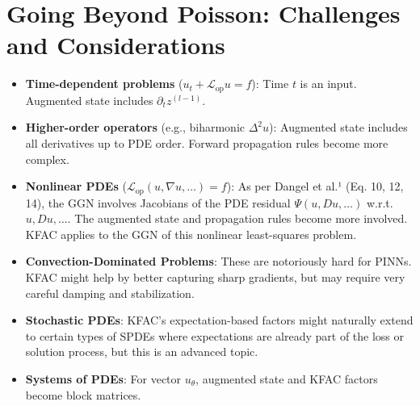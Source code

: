 \documentclass[12pt,a4paper]{article}
\newcommand{\Lop}{\mathcal{L}_{\text{op}}} %
\begin{document}
\section{Going Beyond Poisson: Challenges and Considerations}
\begin{itemize}[nosep,leftmargin=*]
\item \textbf{Time-dependent problems} (\(u_t + \Lop u = f\)): Time \(t\) is an input. Augmented state includes \(\partial_t z^{(l-1)}\).
\item \textbf{Higher-order operators} (e.g., biharmonic \(\Delta^2 u\)): Augmented state includes all derivatives up to PDE order. Forward propagation rules become more complex.
\item \textbf{Nonlinear PDEs} (\(\Lop(u, \nabla u, \dots) = f\)): As per Dangel et al.¹ (Eq. 10, 12, 14), the GGN involves Jacobians of the PDE residual \(\Psi(u, Du, \dots)\) w.r.t. \(u, Du, \dots\). The augmented state and propagation rules become more involved. KFAC applies to the GGN of this nonlinear least-squares problem.
\item \textbf{Convection-Dominated Problems}: These are notoriously hard for PINNs. KFAC might help by better capturing sharp gradients, but may require very careful damping and stabilization.
\item \textbf{Stochastic PDEs}: KFAC's expectation-based factors might naturally extend to certain types of SPDEs where expectations are already part of the loss or solution process, but this is an advanced topic.
\item \textbf{Systems of PDEs}: For vector \(u_\theta\), augmented state and KFAC factors become block matrices.
\end{itemize}
\end{document}
